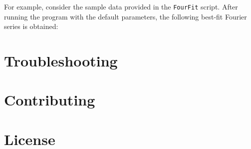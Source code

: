 \documentclass{article}
\begin{document}
For example, consider the sample data provided in the \texttt{FourFit} script. After running the program with the default parameters, the following best-fit Fourier series is obtained:

\section{Troubleshooting}

\section{Contributing}

\section{License}
\end{document}
